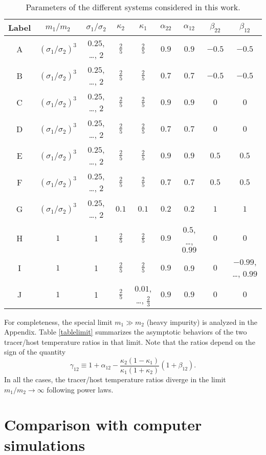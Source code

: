 \documentclass[aps,pre,reprint]{revtex4-1}
\newcommand\beq{\begin{equation}}
\newcommand\eeq{\end{equation}}
\begin{document}
\begin{table*}[htbp]
\caption{\label{cases}Parameters of the different systems considered in this work.}
\begin{ruledtabular}
\begin{tabular}{ccccccccc}
Label&$m_1/m_2$&$\sigma_1/\sigma_2$&$\kappa_2$&$\kappa_1$&$\alpha_{22}$&$\alpha_{12}$&$\beta_{22}$&$\beta_{12}$\\
\hline
A&$(\sigma_1/\sigma_2)^3$&$0.25$, \ldots, $2$&$\frac{2}{5}$&$\frac{2}{5}$&$0.9$&$0.9$&$-0.5$&$-0.5$\\
B&$(\sigma_1/\sigma_2)^3$&$0.25$, \ldots, $2$&$\frac{2}{5}$&$\frac{2}{5}$&$0.7$&$0.7$&$-0.5$&$-0.5$\\
C&$(\sigma_1/\sigma_2)^3$&$0.25$, \ldots, $2$&$\frac{2}{5}$&$\frac{2}{5}$&$0.9$&$0.9$&$0$&$0$\\
D&$(\sigma_1/\sigma_2)^3$&$0.25$, \ldots, $2$&$\frac{2}{5}$&$\frac{2}{5}$&$0.7$&$0.7$&$0$&$0$\\
E&$(\sigma_1/\sigma_2)^3$&$0.25$, \ldots, $2$&$\frac{2}{5}$&$\frac{2}{5}$&$0.9$&$0.9$&$0.5$&$0.5$\\
F&$(\sigma_1/\sigma_2)^3$&$0.25$, \ldots, $2$&$\frac{2}{5}$&$\frac{2}{5}$&$0.7$&$0.7$&$0.5$&$0.5$\\
G&$(\sigma_1/\sigma_2)^3$&$0.25$, \ldots, $2$&$0.1$&$0.1$&$0.2$&$0.2$&$1$&$1$\\
H&$1$&1&$\frac{2}{5}$&$\frac{2}{5}$&$0.9$&$0.5$, \ldots, $0.99$&$0$&$0$\\
I&$1$&1&$\frac{2}{5}$&$\frac{2}{5}$&$0.9$&0.9&$0$&$-0.99$, \ldots, $0.99$\\
J&$1$&1&$\frac{2}{5}$&$0.01$, \ldots, $\frac{2}{3}$&$0.9$&$0.9$&$0$&$0$\\
\end{tabular}
\end{ruledtabular}
\end{table*}

For completeness, the special limit $m_1\gg m_2$ (heavy impurity) is analyzed  in the Appendix. Table \ref{tablelimit} summarizes the asymptotic behaviors of the two tracer/host temperature ratios in that limit. Note that the  ratios depend on the sign of the quantity
\beq
\label{g12}
\gamma_{12}\equiv 1+\alpha_{12}-\frac{\kappa_2(1-\kappa_1)}{\kappa_1(1+\kappa_2)}(1+\beta_{12}).
\eeq
In all the cases, the tracer/host temperature ratios diverge in the limit $m_1/m_2\to\infty$ following power laws.


\section{Comparison with computer simulations}
\label{sec4}
\end{document}
